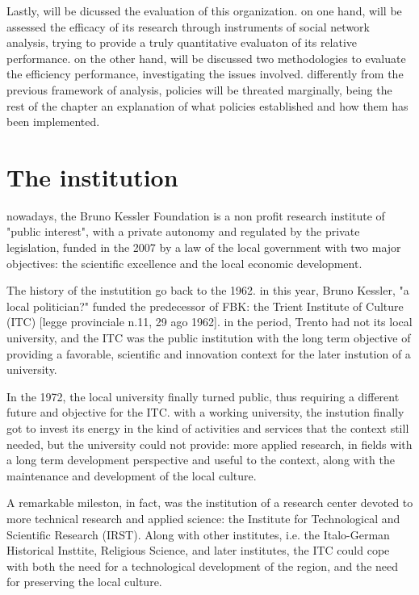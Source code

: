 Lastly, will be dicussed the evaluation of this organization. on one hand, will be assessed the efficacy of its research  through instruments of social network analysis, trying to provide a truly quantitative evaluaton of its relative performance. on the other hand, will be discussed two methodologies to evaluate the efficiency performance, investigating the issues involved. differently from the previous framework of analysis, policies will be threated marginally, being the rest of the chapter an explanation of what policies established and how them has been implemented. 

\section{The institution}

nowadays, the Bruno Kessler Foundation is a non profit research institute of "public interest", with a private autonomy and regulated by the private legislation, funded in the 2007 by a law of the local government with two major objectives: the scientific excellence and the local economic development.

The history of the instutition go back to the 1962. in this year, Bruno Kessler, "a local politician?" funded the predecessor of FBK: the Trient Institute of Culture (ITC) [legge provinciale n.11, 29 ago 1962]. in the period, Trento had not its local university, and the ITC was the public institution with the long term objective of providing a favorable, scientific and innovation context for the later instution of a university. 

In the 1972, the local university finally turned public, thus requiring a different future and objective for the ITC. with a working university, the instution finally got to invest its energy in the kind of activities and services that the context still needed, but the university could not provide: more applied research, in fields with a long term development perspective and useful to the context, along with the maintenance and development of the local culture.

A remarkable mileston, in fact, was the institution of a research center devoted to more technical research and applied science: the Institute for Technological and Scientific Research (IRST). Along with other institutes, i.e. the Italo-German Historical Insttite, Religious Science, and later institutes, the ITC could cope with both the need for a technological development of the region, and the need for preserving the local culture. 

